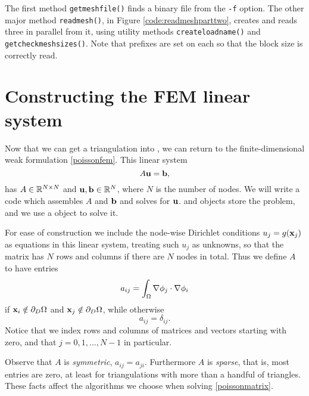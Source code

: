 The first method \texttt{getmeshfile()} finds a \PETSc binary file from the \texttt{-f} option.  The other major method \texttt{readmesh()}, in Figure \ref{code:readmeshparttwo}, creates and reads three \pVecs in parallel from it, using utility methods \texttt{createloadname()} and \texttt{getcheckmeshsizes()}.  Note that prefixes are set on each \pVec so that the block size is correctly read.




\section{Constructing the FEM linear system}

Now that we can get a triangulation into \PETSc, we can return to the finite-dimensional weak formulation \eqref{poissonfem}.  This linear system
\begin{equation}
A \mathbf{u} = \mathbf{b}, \label{poissonmatrix}
\end{equation}
has $A\in\mathbb{R}^{N\times N}$ and $\mathbf{u},\mathbf{b}\in\mathbb{R}^N$, where $N$ is the number of nodes.  We will write a code which assembles $A$ and $\mathbf{b}$ and solves for $\mathbf{u}$.  \PETSc \pMat and \pVec objects store the problem, and we use a \pKSP object to solve it.

For ease of construction we include the node-wise Dirichlet conditions $u_j=g(\mathbf{x}_j)$ as equations in this linear system, treating such $u_j$ as unknowns, so that the matrix has $N$ rows and columns if there are $N$ nodes in total.  Thus we define $A$ to have entries
\begin{equation}
a_{ij} = \int_\Omega \nabla \phi_j \cdot \nabla \phi_i \label{Aentryfem}
\end{equation}
if $\mathbf{x}_i \notin \partial_D \Omega$ and $\mathbf{x}_j \notin \partial_D \Omega$, while otherwise
\begin{equation*}
a_{ij} = \delta_{ij}.
\end{equation*}
Notice that we index rows and columns of matrices and vectors starting with zero, and that $j=0,1,\dots,N-1$ in particular.

Observe that $A$ is \emph{symmetric}, $a_{ij}=a_{ji}$.  Furthermore $A$ is \emph{sparse}, that is, most entries are zero, at least for triangulations with more than a handful of triangles.  These facts affect the algorithms we choose when solving \eqref{poissonmatrix}.

